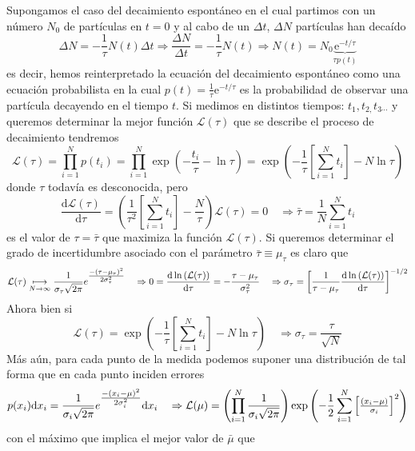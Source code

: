 \documentclass[spanish,titlepage,11pt]{article}
\begin{document}
Supongamos el caso del decaimiento espont\'{a}neo en el cual partimos con un
n\'{u}mero $N_{0}$ de part\'{i}culas en $t=0$ y al cabo de un $\Delta t$,
$\Delta N$ part\'{i}culas han deca\'{i}do
\[
\Delta N=-\frac{1}{\tau}N(t)\Delta t\Rightarrow\frac{\Delta N}{\Delta
t}=-\frac{1}{\tau}N(t)\Rightarrow N(t)=N_{0}\underset{\tau p(t)}%
{\underbrace{\mathrm{e}^{-t/\tau}}}%
\]
es decir, hemos reinterpretado la ecuaci\'{o}n del decaimiento espont\'{a}neo
como una ecuaci\'{o}n probabilista en la cual $p(t)=\frac{1}{\tau}%
\mathrm{e}^{-t/\tau}$ es la probabilidad de observar una part\'{i}cula
decayendo en el tiempo $t.$ Si medimos en distintos tiempos: $t_{1}%
,t_{2,}t_{3\cdots}$ y queremos determinar la mejor funci\'{o}n $\mathcal{L}%
(\tau)$ que se describe el proceso de decaimiento tendremos
\[
\mathcal{L}(\tau)=\prod_{i=1}^{N}p(t_{i})=\prod_{i=1}^{N}\exp\left(
-\frac{t_{i}}{\tau}-\ln\tau\right)  =\exp\left(  -\frac{1}{\tau}\left[
\sum_{i=1}^{N}t_{i}\right]  -N\ln\tau\right)
\]
donde $\tau$ todav\'{i}a es desconocida, pero
\[
\frac{\mathrm{d}\mathcal{L}(\tau)}{\mathrm{d}\tau}=\left(  \frac{1}{\tau^{2}%
}\left[  \sum_{i=1}^{N}t_{i}\right]  -\frac{N}{\tau}\right)  \mathcal{L}%
(\tau)=0\quad\Rightarrow\bar{\tau}=\frac{1}{N}\sum_{i=1}^{N}t_{i}%
\]
es el valor de $\tau=\bar{\tau}$ que maximiza la funci\'{o}n $\mathcal{L}%
(\tau).$ Si queremos determinar el grado de incertidumbre asociado con el
par\'{a}metro $\bar{\tau}\equiv\mu_{\tau}$ es claro que
\[
\mathcal{L}(\tau)\underset{N\rightarrow\infty}{\longmapsto}\frac{1}%
{\sigma_{\tau}\sqrt{2\pi}}{\Large e}^{\tfrac{-\left(  \tau-\mu_{\tau}\right)
^{2}}{2\sigma_{\tau}^{2}}}\quad\Rightarrow0=\frac{\mathrm{d\ln}\left(
\mathcal{L}(\tau)\right)  }{\mathrm{d}\tau}=-\frac{\tau-\mu_{\tau}}%
{\sigma_{\tau}^{2}}\quad\Rightarrow\sigma_{\tau}=\left[  \frac{1}{\tau
-\mu_{\tau}}\frac{\mathrm{d\ln}\left(  \mathcal{L}(\tau)\right)  }%
{\mathrm{d}\tau}\right]  ^{-1/2}%
\]
Ahora bien si
\[
\mathcal{L}(\tau)=\exp\left(  -\frac{1}{\tau}\left[  \sum_{i=1}^{N}%
t_{i}\right]  -N\ln\tau\right)  \quad\Rightarrow\sigma_{\tau}=\frac{\tau
}{\sqrt{N}}%
\]
M\'{a}s a\'{u}n, para cada punto de la medida podemos suponer una
distribuci\'{o}n de tal forma que en cada punto inciden errores
\[
p(x_{i})\mathrm{d}x_{i}=\frac{1}{\sigma_{i}\sqrt{2\pi}}{\Large e}%
^{\tfrac{-\left(  x_{i}-\mu\right)  ^{2}}{2\sigma_{i}^{2}}}\mathrm{d}%
x_{i}\quad\Rightarrow\mathcal{L}(\mu)=\left(  \prod_{i=1}^{N}\frac{1}%
{\sigma_{i}\sqrt{2\pi}}\right)  \exp\left(  -\frac{1}{2}\sum_{i=1}^{N}\left[
\tfrac{\left(  x_{i}-\mu\right)  }{\sigma_{i}}\right]  ^{2}\right)
\]
con el m\'{a}ximo que implica el mejor valor de $\bar{\mu}$ que
\end{document}
